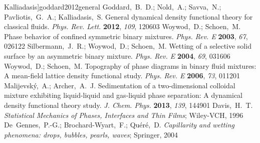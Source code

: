 \documentclass[journal=langd5,manuscript=article]{achemso}
\begin{document}
\begin{mcitethebibliography}{71}
  Kalliadasis]{goddard2012general}
Goddard,~B.~D.; Nold,~A.; Savva,~N.; Pavliotis,~G.~A.; Kalliadasis,~S. General
  dynamical density functional theory for classical fluids. \emph{Phys. Rev.
  Lett.} \textbf{2012}, \emph{109}, 120603\relax
\mciteBstWouldAddEndPuncttrue
\mciteSetBstMidEndSepPunct{\mcitedefaultmidpunct}
{\mcitedefaultendpunct}{\mcitedefaultseppunct}\relax
\EndOfBibitem
{}
Woywod,~D.; Schoen,~M. Phase behavior of confined symmetric binary mixtures.
  \emph{Phys. Rev. E} \textbf{2003}, \emph{67}, 026122\relax
\mciteBstWouldAddEndPuncttrue
\mciteSetBstMidEndSepPunct{\mcitedefaultmidpunct}
{\mcitedefaultendpunct}{\mcitedefaultseppunct}\relax
\EndOfBibitem
{}
Silbermann,~J.~R.; Woywod,~D.; Schoen,~M. Wetting of a selective solid surface
  by an asymmetric binary mixture. \emph{Phys. Rev. E} \textbf{2004},
  \emph{69}, 031606\relax
\mciteBstWouldAddEndPuncttrue
\mciteSetBstMidEndSepPunct{\mcitedefaultmidpunct}
{\mcitedefaultendpunct}{\mcitedefaultseppunct}\relax
\EndOfBibitem
{}
Woywod,~D.; Schoen,~M. Topography of phase diagrams in binary fluid mixtures: A
  mean-field lattice density functional study. \emph{Phys. Rev. E}
  \textbf{2006}, \emph{73}, 011201\relax
\mciteBstWouldAddEndPuncttrue
\mciteSetBstMidEndSepPunct{\mcitedefaultmidpunct}
{\mcitedefaultendpunct}{\mcitedefaultseppunct}\relax
\EndOfBibitem
{}
Malijevsk\'y,~A.; Archer,~A.~J. Sedimentation of a two-dimensional colloidal
  mixture exhibiting liquid-liquid and gas-liquid phase separation: A dynamical
  density functional theory study. \emph{J. Chem. Phys.} \textbf{2013},
  \emph{139}, 144901\relax
\mciteBstWouldAddEndPuncttrue
\mciteSetBstMidEndSepPunct{\mcitedefaultmidpunct}
{\mcitedefaultendpunct}{\mcitedefaultseppunct}\relax
\EndOfBibitem
{}
Davis,~H.~T. \emph{Statistical Mechanics of Phases, Interfaces and Thin Films};
  Wiley-VCH, 1996\relax
\mciteBstWouldAddEndPuncttrue
\mciteSetBstMidEndSepPunct{\mcitedefaultmidpunct}
{\mcitedefaultendpunct}{\mcitedefaultseppunct}\relax
\EndOfBibitem
{}
De~Gennes,~P.-G.; Brochard-Wyart,~F.; Qu{\'e}r{\'e},~D. \emph{Capillarity and
  wetting phenomena: drops, bubbles, pearls, waves}; Springer, 2004\relax
\mciteBstWouldAddEndPuncttrue
\mciteSetBstMidEndSepPunct{\mcitedefaultmidpunct}

\end{mcitethebibliography}
\end{document}
